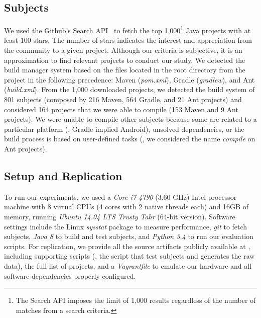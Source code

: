 \subsection{Subjects}
\label{sec:subjects}

We used the Github's
Search API~\cite{githubsearch} to fetch the top 1,000\footnote{The
Search API imposes the limit of 1,000 results regardless of the number
of matches from a search criteria.} Java projects with at least 100
stars. The number of stars indicates the interest and appreciation
from the community to a given project.
 Although our
criteria is subjective, it is an approximation to find relevant
projects to conduct our study. We detected the build manager system
based on the files located in the root directory from the project in
the following precedence: Maven (\emph{pom.xml}), Gradle
(\emph{gradlew}), and Ant (\emph{build.xml}).
From the 1,000 downloaded projects, we detected the build system of
801 subjects (composed by 216 Maven, 564 Gradle, and 21 Ant projects)
and considered 164 projects that we were able to compile (153 Maven
and 9 Ant projects).  We were unable to compile other subjects because
some are related to a particular platform (\eg, Gradle implied
Android), unsolved dependencies, or the build process is based on
user-defined tasks (\eg, we considered the name \emph{compile} on Ant
projects).

\subsection{Setup and Replication}
\label{sec:setup}

To run our experiments, we used a \emph{Core i7-4790} (3.60 GHz) Intel
processor machine with 8 virtual CPUs (4 cores with 2 native threads
each) and 16GB of memory, running \emph{Ubuntu 14.04 LTS Trusty Tahr}
(64-bit version). Software settings include the Linux \emph{sysstat}
package to measure performance, \emph{git} to fetch subjects,
\emph{Java 8} to build and test subjects, and \emph{Python 3.4} to run
our evaluation scripts. For replication, we provide all the source
artifacts publicly available at , including
supporting scripts (\eg, the script that test subjects and generates
the raw data), the full list of projects, and a \emph{Vagrantfile} to
emulate our hardware and all software dependencies properly configured.

